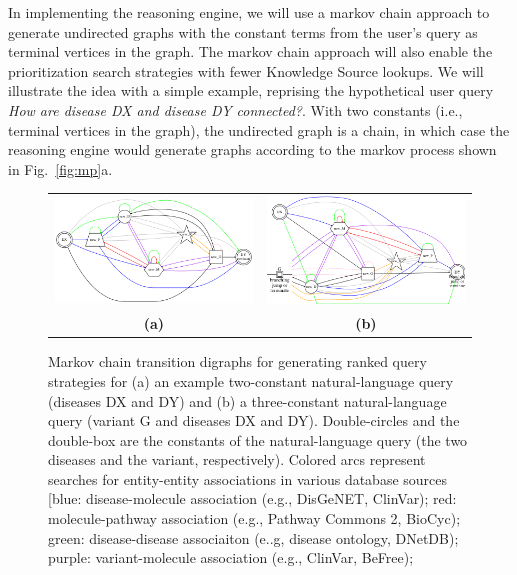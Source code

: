 \documentclass[11pt,notitlepage]{article}
\begin{document}
In implementing the reasoning engine, we will use a markov chain approach to
generate undirected graphs with the constant terms from the user's query as
terminal vertices in the graph. The markov chain approach will also enable the
prioritization search strategies with fewer Knowledge Source lookups.  We will
illustrate the idea with a simple example, reprising the hypothetical user query
{\em How are disease DX and disease DY connected?}. With two constants (i.e.,
terminal vertices in the graph), the undirected graph is a chain, in which case
the reasoning engine would generate graphs according to the markov process
shown in Fig.~\ref{fig:mp}a.
\begin{figure}[h!]
  \begin{tabular}{cc}
    \includegraphics[width=3in]{markov1.png} &
    \includegraphics[width=3in]{markov2.png} \\
                    {\bf (a)} & {\bf (b)}
  \end{tabular}
  \caption{Markov chain transition digraphs for generating ranked query
    strategies for (a) an example two-constant natural-language query (diseases
    DX and DY) and (b) a three-constant natural-language query (variant G and
    diseases DX and DY). Double-circles and the double-box are the constants of
    the natural-language query (the two diseases and the variant, respectively).
    Colored arcs represent searches for entity-entity associations in various
    database sources [blue: disease-molecule association (e.g., DisGeNET,
      ClinVar); red: molecule-pathway association (e.g., Pathway Commons 2,
      BioCyc); green: disease-disease associaiton (e..g, disease ontology,
      DNetDB); purple: variant-molecule association (e.g., ClinVar, BeFree);
}
\end{figure}
\end{document}

